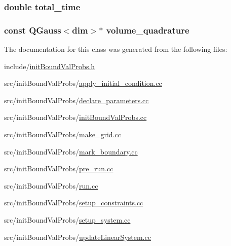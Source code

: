 \subsubsection[{total\-\_\-time}]{\setlength{\rightskip}{0pt plus 5cm}double total\-\_\-time}\label{classinit_bound_val_probs_abc276e47b85df9dd59f248e663b3b971}
\subsubsection[{volume\-\_\-quadrature}]{\setlength{\rightskip}{0pt plus 5cm}const Q\-Gauss$<$dim$>$$\ast$ volume\-\_\-quadrature}\label{classinit_bound_val_probs_a7e2363a91f6f1626f463f3a06108c03b}


The documentation for this class was generated from the following files\-:\begin{DoxyCompactItemize}
\item 
include/\hyperlink{init_bound_val_probs_8h}{init\-Bound\-Val\-Probs.\-h}\item 
src/init\-Bound\-Val\-Probs/\hyperlink{apply__initial__condition_8cc}{apply\-\_\-initial\-\_\-condition.\-cc}\item 
src/init\-Bound\-Val\-Probs/\hyperlink{init_bound_val_probs_2declare__parameters_8cc}{declare\-\_\-parameters.\-cc}\item 
src/init\-Bound\-Val\-Probs/\hyperlink{init_bound_val_probs_8cc}{init\-Bound\-Val\-Probs.\-cc}\item 
src/init\-Bound\-Val\-Probs/\hyperlink{make__grid_8cc}{make\-\_\-grid.\-cc}\item 
src/init\-Bound\-Val\-Probs/\hyperlink{mark__boundary_8cc}{mark\-\_\-boundary.\-cc}\item 
src/init\-Bound\-Val\-Probs/\hyperlink{pre__run_8cc}{pre\-\_\-run.\-cc}\item 
src/init\-Bound\-Val\-Probs/\hyperlink{run_8cc}{run.\-cc}\item 
src/init\-Bound\-Val\-Probs/\hyperlink{setup__constraints_8cc}{setup\-\_\-constraints.\-cc}\item 
src/init\-Bound\-Val\-Probs/\hyperlink{setup__system_8cc}{setup\-\_\-system.\-cc}\item 
src/init\-Bound\-Val\-Probs/\hyperlink{update_linear_system_8cc}{update\-Linear\-System.\-cc}\end{DoxyCompactItemize}
